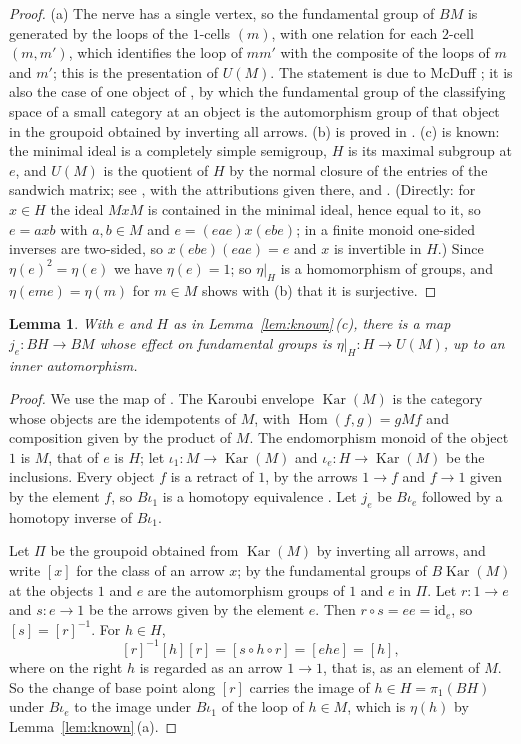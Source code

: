 \documentclass[11pt,a4paper]{article}
\newtheorem{lemma}[theorem]{Lemma}
\theoremstyle{definition}
\newcommand{\Kar}{\operatorname{Kar}}
\newcommand{\Hom}{\operatorname{Hom}}
\newcommand{\id}{\mathrm{id}}
\begin{document}
\begin{proof}
(a) The nerve has a single vertex, so the fundamental group of $BM$ is
generated by the loops of the $1$-cells $(m)$, with one relation for each
$2$-cell $(m,m')$, which identifies the loop of $mm'$ with the composite of
the loops of $m$ and $m'$; this is the presentation of $U(M)$. The statement
is due to McDuff \cite[Lemma~1, p.~314]{McD}; it is also the case of one
object of
\cite[\S1, Proposition~1]{Qu}, by which the fundamental group of the
classifying space of a small category at an object is the automorphism group
of that object in the groupoid obtained by inverting all arrows. (b) is
proved in \cite[\S7]{BB}. (c) is known: the minimal ideal is a completely
simple semigroup, $H$ is its maximal subgroup at $e$, and $U(M)$ is the
quotient of $H$ by the normal closure of the entries of the sandwich matrix;
see \cite[\S2.1 and Lemma~2.1]{Sw}, with the attributions given there, and
\cite[p.~7]{St}. (Directly: for $x\in H$ the ideal
$MxM$ is contained in the minimal ideal, hence equal to it, so $e=axb$ with
$a,b\in M$ and $e=(eae)x(ebe)$; in a finite monoid one-sided inverses are
two-sided, so $x(ebe)(eae)=e$ and $x$ is invertible in $H$.) Since
$\eta(e)^2=\eta(e)$ we have $\eta(e)=1$; so $\eta|_H$ is a homomorphism of
groups, and $\eta(eme)=\eta(m)$ for $m\in M$ shows with (b) that it is
surjective.
\end{proof}

\begin{lemma}\label{lem:je}
With $e$ and $H$ as in Lemma~\ref{lem:known}\,\textup{(c)}, there is a map
$j_e\colon BH\to BM$ whose effect on fundamental groups is
$\eta|_H\colon H\to U(M)$, up to an inner automorphism.
\end{lemma}

\begin{proof}
We use the map of \cite[Introduction]{BB}. The Karoubi envelope $\Kar(M)$
is the category whose objects are the idempotents of $M$, with
$\Hom(f,g)=gMf$ and composition given by the product of $M$. The
endomorphism monoid of the object $1$ is $M$, that of $e$ is $H$; let
$\iota_1\colon M\to\Kar(M)$ and $\iota_e\colon H\to\Kar(M)$ be the
inclusions. Every object $f$ is a retract of $1$, by the arrows $1\to f$
and $f\to1$ given by the element $f$, so $B\iota_1$ is a homotopy
equivalence \cite[Lemma~2.4]{BB}. Let $j_e$ be $B\iota_e$ followed by a
homotopy inverse of $B\iota_1$.

Let $\Pi$ be the groupoid obtained from $\Kar(M)$ by inverting all arrows,
and write $[x]$ for the class of an arrow $x$; by \cite[\S1,
Proposition~1]{Qu} the fundamental groups of $B\Kar(M)$ at the objects $1$
and $e$ are the automorphism groups of $1$ and $e$ in $\Pi$. Let
$r\colon1\to e$ and $s\colon e\to1$ be the arrows given by the element $e$.
Then $r\circ s=ee=\id_e$, so $[s]=[r]^{-1}$. For $h\in H$,
\[
 [r]^{-1}[h][r]=[s\circ h\circ r]=[ehe]=[h],
\]
where on the right $h$ is regarded as an arrow $1\to1$, that is, as an
element of $M$. So the change of base point along $[r]$ carries the image of
$h\in H=\pi_1(BH)$ under $B\iota_e$ to the image under $B\iota_1$ of the loop
of $h\in M$, which is $\eta(h)$ by Lemma~\ref{lem:known}\,(a).
\end{proof}
\end{document}
